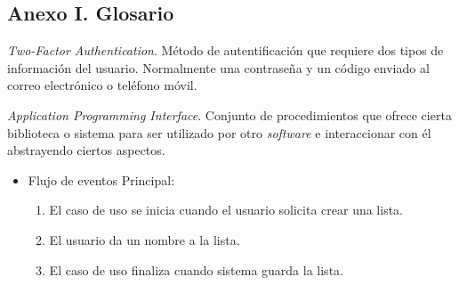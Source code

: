 \documentclass{article}
\begin{document}
\subsection*{Anexo I. Glosario}

\begin{description}
    \setlength\itemsep{0em}
    \item[2FA] \textit{Two-Factor Authentication}. Método de autentificación que requiere dos tipos de información del usuario. Normalmente una contraseña y un código enviado al correo electrónico o teléfono móvil.
    \item[API] \textit{Application Programming Interface}. Conjunto de procedimientos que ofrece cierta biblioteca o sistema para ser utilizado por otro \textit{software} e interaccionar con él abstrayendo ciertos aspectos.
\end{description}

\begin{itemize} %
    \item Flujo de eventos Principal:
    \begin{enumerate} %
        \item El caso de uso se inicia cuando el usuario solicita crear una lista.
        \item El usuario da un nombre a la lista.
        \item El caso de uso finaliza cuando sistema guarda la lista.
    \end{enumerate}
\end{itemize}
\end{document}
